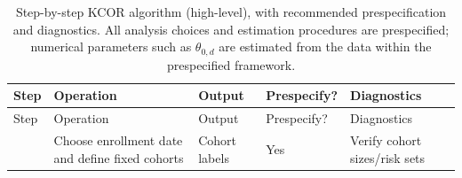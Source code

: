 \documentclass[
]{article}
\begin{document}
\begin{longtable}[]{@{}
  >{\raggedright\arraybackslash}p{}
  >{\raggedright\arraybackslash}p{}
  >{\raggedright\arraybackslash}p{}
  >{\raggedright\arraybackslash}p{}
  >{\raggedright\arraybackslash}p{}@{}}
\caption{Step-by-step KCOR algorithm (high-level), with recommended
prespecification and diagnostics. All analysis choices and estimation
procedures are prespecified; numerical parameters such as
\(\theta_{0,d}\) are estimated from the data within the prespecified
framework.}\label{tbl:KCOR_algorithm}\tabularnewline
\toprule\noalign{}
\begin{minipage}[b]{\linewidth}\raggedright
Step
\end{minipage} & \begin{minipage}[b]{\linewidth}\raggedright
Operation
\end{minipage} & \begin{minipage}[b]{\linewidth}\raggedright
Output
\end{minipage} & \begin{minipage}[b]{\linewidth}\raggedright
Prespecify?
\end{minipage} & \begin{minipage}[b]{\linewidth}\raggedright
Diagnostics
\end{minipage} \\
\midrule\noalign{}
\endfirsthead
\toprule\noalign{}
\begin{minipage}[b]{\linewidth}\raggedright
Step
\end{minipage} & \begin{minipage}[b]{\linewidth}\raggedright
Operation
\end{minipage} & \begin{minipage}[b]{\linewidth}\raggedright
Output
\end{minipage} & \begin{minipage}[b]{\linewidth}\raggedright
Prespecify?
\end{minipage} & \begin{minipage}[b]{\linewidth}\raggedright
Diagnostics
\end{minipage} \\
\midrule\noalign{}
\endhead
\bottomrule\noalign{}
\endlastfoot
1 & Choose enrollment date and define fixed cohorts & Cohort labels &
Yes & Verify cohort sizes/risk sets \\

\end{longtable}
\end{document}
